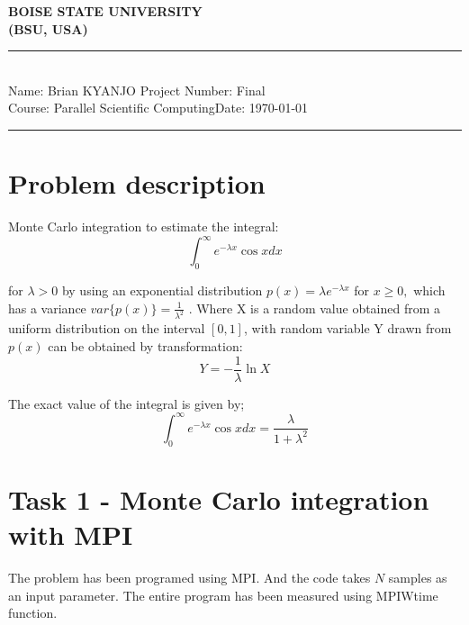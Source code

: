 \documentclass[12pt,a4paper]{article}
\newcommand{\student}{Brian KYANJO }
\newcommand{\course}{Parallel Scientific Computing}
\newcommand{\assignment}{Final}
\begin{document}
	
	\thispagestyle{empty}
	\begin{center}
		\textbf{BOISE STATE UNIVERSITY \\[0.5cm]
			(BSU, USA)}
		\vspace{.2cm}
	\end{center}
	
	\noindent
	\rule{17cm}{0.2cm}\\[0.3cm]
	Name: \student \hfill Project Number: \assignment\\[0.1cm]
	Course: \course \hfill Date: \today\\
	\rule{17cm}{0.05cm}
	\vspace{.2cm}

\section*{Problem description}
Monte Carlo integration to estimate the integral:
$$\int_{0}^{\infty} e^{-\lambda x} \cos x dx $$

 \noindent for $\lambda > 0$ by using an exponential distribution $p(x) = \lambda e^{- \lambda x}$ for $x \ge 0,$ which has a variance $var\{p(x)\} = \frac{1}{\lambda^{2}}$ . Where X is a random value obtained from a uniform distribution on the interval $[0,1]$, with random variable Y drawn from $p(x)$ can be obtained by transformation:
 $$Y = -\frac{1}{\lambda} \ln X$$
 
 The exact value of the integral is given by;
 $$\int_{0}^{\infty} e^{-\lambda x} \cos x dx = \frac{\lambda}{1 + \lambda^{2}} $$

\section*{Task 1 - Monte Carlo integration with MPI}
The  problem  has been programed using MPI. And the code takes $N$ samples as an input parameter. The entire program has been measured  using MPI\textunderscore Wtime function.
\end{document}
